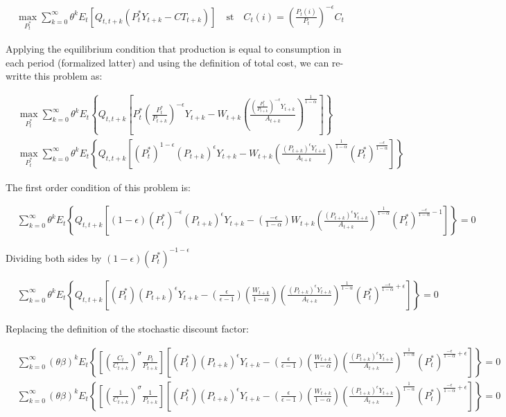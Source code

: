 \documentclass[11pt]{article}
\begin{document}
\begin{align*}
\max_{P_t^*} \sum_{k=0}^{\infty}\theta^k E_t[Q_{t,t+k}(P_t^*Y_{t+k}-CT_{t+k})] \quad \text{st} \quad C_t(i)=\left(\frac{P_t(i)}{P_t}\right)^{-\epsilon}C_t
\end{align*}

Applying the equilibrium condition that production is equal to consumption in each period (formalized latter) and using the definition of total cost, we can re-writte this problem as:

\begin{align*}
&\max_{P_t^*} \sum_{k=0}^{\infty}\theta^k E_t\left\{Q_{t,t+k}\left[P_t^*\left(\frac{P_t^*}{P_{t+k}}\right)^{-\epsilon}Y_{t+k}-W_{t+k}\left(\frac{\left(\frac{P_t^*}{P_{t+k}}\right)^{-\epsilon}Y_{t+k}}{A_{t+k}}\right)^{\frac{1}{1-\alpha}}\right]\right\}\\
&\max_{P_t^*} \sum_{k=0}^{\infty}\theta^k E_t\left\{Q_{t,t+k}\left[(P_t^*)^{1-\epsilon}(P_{t+k})^{\epsilon}Y_{t+k}-W_{t+k}\left(\frac{(P_{t+k})^{\epsilon}Y_{t+k}}{A_{t+k}}\right)^{\frac{1}{1-\alpha}}(P_t^*)^{\frac{-\epsilon}{1-\alpha}}\right]\right\}
\end{align*}

The first order condition of this problem is:

{\small
\begin{align*}
&\sum_{k=0}^{\infty}\theta^k E_t\left\{Q_{t,t+k}\left[(1-\epsilon)(P_t^*)^{-\epsilon}(P_{t+k})^{\epsilon}Y_{t+k}-\left(\frac{-\epsilon}{1-\alpha}\right)W_{t+k}\left(\frac{(P_{t+k})^{\epsilon}Y_{t+k}}{A_{t+k}}\right)^{\frac{1}{1-\alpha}}(P_t^*)^{\frac{-\epsilon}{1-\alpha}-1}\right]\right\}=0
\end{align*}
}

Dividing both sides by $(1-\epsilon)(P_t^*)^{-1-\epsilon}$

\begin{align*}
&\sum_{k=0}^{\infty}\theta^k E_t\left\{Q_{t,t+k}\left[(P_t^*)(P_{t+k})^{\epsilon}Y_{t+k}-\left(\frac{\epsilon}{\epsilon-1}\right)\left(\frac{W_{t+k}}{1-\alpha}\right)\left(\frac{(P_{t+k})^{\epsilon}Y_{t+k}}{A_{t+k}}\right)^{\frac{1}{1-\alpha}}(P_t^*)^{\frac{-\epsilon}{1-\alpha}+\epsilon}\right]\right\}=0
\end{align*}

Replacing the definition of the stochastic discount factor:

{\footnotesize
\begin{align*}
&\sum_{k=0}^{\infty}(\theta\beta)^k E_t\left\{ \left[\left(\frac{C_t}{C_{t+k}}\right)^{\sigma}\frac{P_t}{P_{t+k}}\right]\left[(P_t^*)(P_{t+k})^{\epsilon}Y_{t+k}-\left(\frac{\epsilon}{\epsilon-1}\right)\left(\frac{W_{t+k}}{1-\alpha}\right)\left(\frac{(P_{t+k})^{\epsilon}Y_{t+k}}{A_{t+k}}\right)^{\frac{1}{1-\alpha}}(P_t^*)^{\frac{-\epsilon}{1-\alpha}+\epsilon}\right]\right\}=0\\
&\sum_{k=0}^{\infty}(\theta\beta)^k E_t\left\{ \left[\left(\frac{1}{C_{t+k}}\right)^{\sigma}\frac{1}{P_{t+k}}\right]\left[(P_t^*)(P_{t+k})^{\epsilon}Y_{t+k}-\left(\frac{\epsilon}{\epsilon-1}\right)\left(\frac{W_{t+k}}{1-\alpha}\right)\left(\frac{(P_{t+k})^{\epsilon}Y_{t+k}}{A_{t+k}}\right)^{\frac{1}{1-\alpha}}(P_t^*)^{\frac{-\epsilon}{1-\alpha}+\epsilon}\right]\right\}=0
\end{align*}
}
\end{document}
